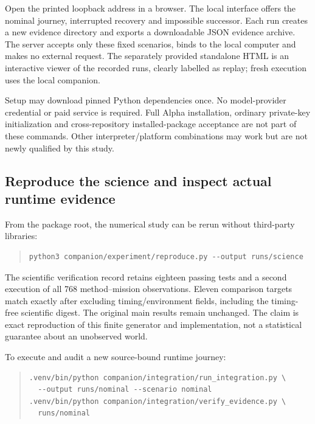 \documentclass[11pt]{article}
\begin{document}
Open the printed loopback address in a browser. The local interface offers the nominal journey, interrupted recovery and impossible successor. Each run creates a new evidence directory and exports a downloadable JSON evidence archive. The server accepts only these fixed scenarios, binds to the local computer and makes no external request. The separately provided standalone HTML is an interactive viewer of the recorded runs, clearly labelled as replay; fresh execution uses the local companion.

Setup may download pinned Python dependencies once. No model-provider credential or paid service is required. Full Alpha installation, ordinary private-key initialization and cross-repository installed-package acceptance are not part of these commands. Other interpreter/platform combinations may work but are not newly qualified by this study.

\subsection{Reproduce the science and inspect actual runtime evidence}

From the package root, the numerical study can be rerun without third-party libraries:

\begin{quote}\small
\begin{verbatim}
python3 companion/experiment/reproduce.py --output runs/science
\end{verbatim}
\end{quote}

The scientific verification record retains eighteen passing tests and a second execution of all 768 method--mission observations. Eleven comparison targets match exactly after excluding timing/environment fields, including the timing-free scientific digest. The original main results remain unchanged. The claim is exact reproduction of this finite generator and implementation, not a statistical guarantee about an unobserved world.

To execute and audit a new source-bound runtime journey:

\begin{quote}\small
\begin{verbatim}
.venv/bin/python companion/integration/run_integration.py \
  --output runs/nominal --scenario nominal
.venv/bin/python companion/integration/verify_evidence.py \
  runs/nominal
\end{verbatim}
\end{quote}
\end{document}
